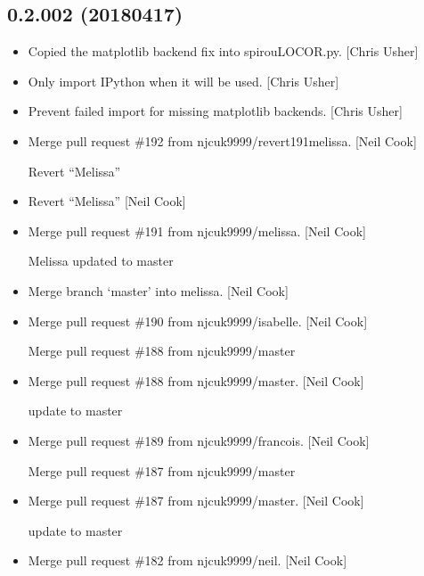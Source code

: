 \documentclass[a4paper,10pt,english]{report}
\begin{document}
\subsection{0.2.002 (2018\sphinxhyphen{}04\sphinxhyphen{}17)}
\label{\detokenize{misc/changelog:id479}}\begin{itemize}
\item {} 
Copied the matplotlib backend fix into spirouLOCOR.py. {[}Chris Usher{]}

\item {} 
Only import IPython when it will be used. {[}Chris Usher{]}

\item {} 
Prevent failed import for missing matplotlib backends. {[}Chris Usher{]}

\item {} 
Merge pull request \#192 from njcuk9999/revert\sphinxhyphen{}191\sphinxhyphen{}melissa. {[}Neil Cook{]}

Revert “Melissa”

\item {} 
Revert “Melissa” {[}Neil Cook{]}

\item {} 
Merge pull request \#191 from njcuk9999/melissa. {[}Neil Cook{]}

Melissa \sphinxhyphen{} updated to master

\item {} 
Merge branch ‘master’ into melissa. {[}Neil Cook{]}

\item {} 
Merge pull request \#190 from njcuk9999/isabelle. {[}Neil Cook{]}

Merge pull request \#188 from njcuk9999/master

\item {} 
Merge pull request \#188 from njcuk9999/master. {[}Neil Cook{]}

update to master

\item {} 
Merge pull request \#189 from njcuk9999/francois. {[}Neil Cook{]}

Merge pull request \#187 from njcuk9999/master

\item {} 
Merge pull request \#187 from njcuk9999/master. {[}Neil Cook{]}

update to master

\item {} 
Merge pull request \#182 from njcuk9999/neil. {[}Neil Cook{]}


\end{itemize}
\end{document}
